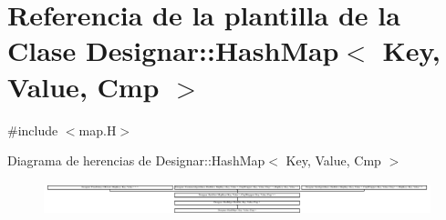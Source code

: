 \hypertarget{class_designar_1_1_hash_map}{}\section{Referencia de la plantilla de la Clase Designar\+:\+:Hash\+Map$<$ Key, Value, Cmp $>$}
\label{class_designar_1_1_hash_map}


{\ttfamily \#include $<$map.\+H$>$}

Diagrama de herencias de Designar\+:\+:Hash\+Map$<$ Key, Value, Cmp $>$\begin{figure}[H]
\begin{center}
\leavevmode
\includegraphics[height=0.969697cm]{class_designar_1_1_hash_map}
\end{center}
\end{figure}
